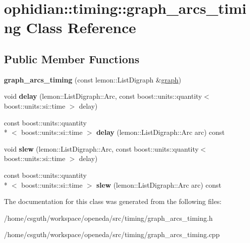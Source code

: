 \hypertarget{classophidian_1_1timing_1_1graph__arcs__timing}{\section{ophidian\-:\-:timing\-:\-:graph\-\_\-arcs\-\_\-timing Class Reference}
\label{classophidian_1_1timing_1_1graph__arcs__timing}
}
\subsection*{Public Member Functions}
\begin{DoxyCompactItemize}
\item 
\hypertarget{classophidian_1_1timing_1_1graph__arcs__timing_a8957dab8866bcc96d270d9c5b5d341b9}{{\bfseries graph\-\_\-arcs\-\_\-timing} (const lemon\-::\-List\-Digraph \&\hyperlink{classophidian_1_1timing_1_1graph}{graph})}\label{classophidian_1_1timing_1_1graph__arcs__timing_a8957dab8866bcc96d270d9c5b5d341b9}

\item 
\hypertarget{classophidian_1_1timing_1_1graph__arcs__timing_ac6e7c463997b5196e9f406bf33735e0a}{void {\bfseries delay} (lemon\-::\-List\-Digraph\-::\-Arc, const boost\-::units\-::quantity$<$ boost\-::units\-::si\-::time $>$ delay)}\label{classophidian_1_1timing_1_1graph__arcs__timing_ac6e7c463997b5196e9f406bf33735e0a}

\item 
\hypertarget{classophidian_1_1timing_1_1graph__arcs__timing_a26ea9fcad7051f9ecb33071046bb591b}{const boost\-::units\-::quantity\\*
$<$ boost\-::units\-::si\-::time $>$ {\bfseries delay} (lemon\-::\-List\-Digraph\-::\-Arc arc) const }\label{classophidian_1_1timing_1_1graph__arcs__timing_a26ea9fcad7051f9ecb33071046bb591b}

\item 
\hypertarget{classophidian_1_1timing_1_1graph__arcs__timing_a3dc923c0f62f227c07f476b3aea6391f}{void {\bfseries slew} (lemon\-::\-List\-Digraph\-::\-Arc, const boost\-::units\-::quantity$<$ boost\-::units\-::si\-::time $>$ delay)}\label{classophidian_1_1timing_1_1graph__arcs__timing_a3dc923c0f62f227c07f476b3aea6391f}

\item 
\hypertarget{classophidian_1_1timing_1_1graph__arcs__timing_afbc3ecdade4fe977321b9372b4f1933b}{const boost\-::units\-::quantity\\*
$<$ boost\-::units\-::si\-::time $>$ {\bfseries slew} (lemon\-::\-List\-Digraph\-::\-Arc arc) const }\label{classophidian_1_1timing_1_1graph__arcs__timing_afbc3ecdade4fe977321b9372b4f1933b}

\end{DoxyCompactItemize}


The documentation for this class was generated from the following files\-:\begin{DoxyCompactItemize}
\item 
/home/csguth/workspace/openeda/src/timing/graph\-\_\-arcs\-\_\-timing.\-h\item 
/home/csguth/workspace/openeda/src/timing/graph\-\_\-arcs\-\_\-timing.\-cpp\end{DoxyCompactItemize}

